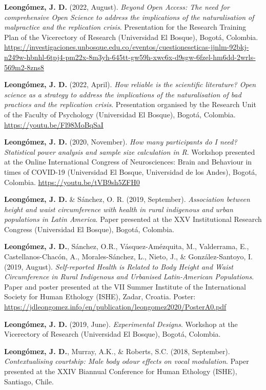 \documentclass[11pt,a4paper,]{awesome-cv}
\begin{document}
\textbf{Leongómez, J. D.} (2022, August). \emph{Beyond Open Access: The
need for comprehensive Open Science to address the implications of the
naturalisation of malpractice and the replication crisis}. Presentation
for the Research Training Plan of the Vicerectory of Research
(Universidad El Bosque), Bogotá, Colombia.
\url{https://investigaciones.unbosque.edu.co/eventos/cuestioneseticas-jjnlm-92bkj-n249w-hbnhl-6tpj4-pm22x-8m3yh-645tt-gw59h-xwc6x-d9sgw-6fzel-hm6dd-2wrls-569m2-8zns8}

\textbf{Leongómez, J. D.} (2022, April). \emph{How reliable is the
scientific literature? Open science as a strategy to address the
implications of the naturalisation of bad practices and the replication
crisis}. Presentation organised by the Research Unit of the Faculty of
Psychology (Universidad El Bosque), Bogotá, Colombia.
\url{https://youtu.be/Fl98MoBqSaI}

\textbf{Leongómez, J. D.} (2020, November). \emph{How many participants
do I need? Statistical power analysis and sample size calculation in R}.
Workshop presented at the Online International Congress of
Neurosciences: Brain and Behaviour in times of COVID-19 (Universidad El
Bosque, Universidad de los Andes), Bogotá, Colombia.
\url{https://youtu.be/tVB9sh5ZFH0}

\textbf{Leongómez, J. D.} \& Sánchez, O. R. (2019, September).
\emph{Association between height and waist circumference with health in
rural indigenous and urban populations in Latin America}. Paper
presented at the XXV Institutional Research Congress (Universidad El
Bosque), Bogotá, Colombia.

\textbf{Leongómez, J. D.}, Sánchez, O.R., Vásquez-Amézquita, M.,
Valderrama, E., Castellanos-Chacón, A., Morales-Sánchez, L., Nieto, J.,
\& González-Santoyo, I. (2019, August). \emph{Self-reported Health is
Related to Body Height and Waist Circumference in Rural Indigenous and
Urbanised Latin-American Populations}. Paper and poster presented at the
VII Summer Institute of the International Society for Human Ethology
(ISHE), Zadar, Croatia. Poster:
\url{https://jdleongomez.info/en/publication/leongomez2020/PosterA0.pdf}

\textbf{Leongómez, J. D.} (2019, June). \emph{Experimental Designs}.
Workshop at the Vicerectory of Research (Universidad El Bosque), Bogotá,
Colombia.

\textbf{Leongómez, J. D.}, Murray, A.K., \& Roberts, S.C. (2018,
September). \emph{Contextualising courtship: Male body odour effects on
vocal modulation}. Paper presented at the XXIV Biannual Conference for
Human Ethology (ISHE), Santiago, Chile.
\end{document}
